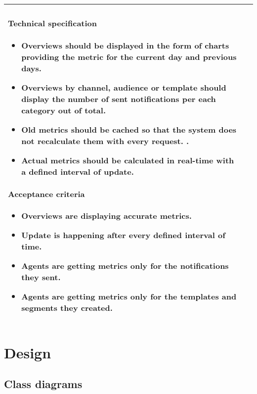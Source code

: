 \begin{longtable}{ | m{} | m{} | }
    \paragraph*{Technical specification} \mbox{} \newline
    \begin{itemize}
        \item Overviews should be displayed in the form of charts providing the metric for the current day and previous days.
        \item Overviews by channel, audience or template should display the number of sent notifications per each category
              out of total.
        \item Old metrics should be cached so that the system does not recalculate them with every request.        .
        \item Actual metrics should be calculated in real-time with a defined interval of update.
    \end{itemize}
    \paragraph*{Acceptance criteria} \mbox{} \newline
    \begin{itemize}
        \item Overviews are displaying accurate metrics.
        \item Update is happening after every defined interval of time.
        \item Agents are getting metrics only for the notifications they sent.
        \item Agents are getting metrics only for the templates and segments they created.
    \end{itemize}                                                                                                                                                            \\
    \hline
\end{longtable}

\section{Design}
\subsection{Class diagrams}

